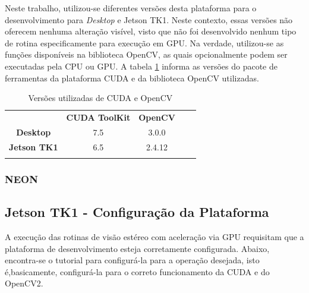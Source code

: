 Neste trabalho, utilizou-se diferentes versões desta plataforma para o desenvolvimento para \textit{Desktop} e Jetson TK1. Neste contexto, essas versões não oferecem nenhuma alteração visível, visto que não foi desenvolvido nenhum tipo de rotina especificamente para execução em GPU. Na verdade, utilizou-se as funções disponíveis na biblioteca OpenCV, as quais opcionalmente podem ser executadas pela CPU ou GPU. A tabela \ref{cudaopencv} informa as versões do pacote de ferramentas da plataforma CUDA e da biblioteca OpenCV utilizadas. 

\begin{table}[]
\centering
\caption{Versões utilizadas de CUDA e OpenCV}
\label{cudaopencv}
\begin{tabular}{cccll}
                     & \textbf{CUDA ToolKit}	     & \textbf{OpenCV} 	       &  &  \\
\textbf{Desktop}     & 7.5                           & 3.0.0                   &  &  \\
\textbf{Jetson TK1}  & 6.5                           & 2.4.12                  &  &  \\
\multicolumn{1}{l}{} & \multicolumn{1}{l}{}          & \multicolumn{1}{l}{}    &  & 
\end{tabular}
\end{table}

\subsubsection{NEON}


\subsection{Jetson TK1 - Configuração da Plataforma}

A execução das rotinas de visão estéreo com aceleração via GPU requisitam que a plataforma de desenvolvimento esteja corretamente configurada. Abaixo, encontra-se o tutorial para configurá-la para a operação desejada, isto é,basicamente, configurá-la para o correto funcionamento da CUDA e do OpenCV2. 

